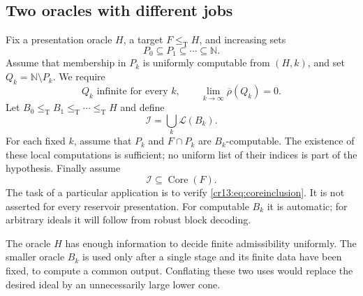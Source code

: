 \documentclass[11pt,letterpaper]{article}
\theoremstyle{definition}
\theoremstyle{remark}\newtheorem{remark}[theorem]{Remark}
\numberwithin{equation}{section}
\newcommand{\N}{\mathbb N}
\newcommand{\leT}{\leq_{\mathrm T}}
\newcommand{\Low}{\mathcal L}
\newcommand{\Core}{\operatorname{Core}}
\newcommand{\updens}{\overline\rho}
\newcommand{\Ideal}{\mathcal I}
\begin{document}
\subsection{Two oracles with different jobs}
Fix a presentation oracle $H$, a target $F\leT H$, and increasing sets
\[
                  P_0\subseteq P_1\subseteq\cdots\subseteq\N.
\]
Assume that membership in $P_k$ is uniformly computable from $(H,k)$, and set $Q_k=\N\setminus P_k$. We require
\begin{equation}\label{cr13:eq:smalltails}
                  Q_k\text{ infinite for every }k,
             \qquad\lim_{k\to\infty}\updens(Q_k)=0.
\end{equation}
Let $B_0\leT B_1\leT\cdots\leT H$ and define
\begin{equation}\label{cr13:eq:idealchain}
                         \Ideal=\bigcup_k\Low(B_k).
\end{equation}
For each fixed $k$, assume that $P_k$ and $F\cap P_k$ are $B_k$-computable. The existence of these local computations is sufficient; no uniform list of their indices is part of the hypothesis. Finally assume
\begin{equation}\label{cr13:eq:coreinclusion}
                               \Ideal\subseteq\Core(F).
\end{equation}
The task of a particular application is to verify \eqref{cr13:eq:coreinclusion}. It is not asserted for every reservoir presentation. For computable $B_k$ it is automatic; for arbitrary ideals it will follow from robust block decoding.

The oracle $H$ has enough information to decide finite admissibility uniformly. The smaller oracle $B_k$ is used only after a single stage and its finite data have been fixed, to compute a common output. Conflating these two uses would replace the desired ideal by an unnecessarily large lower cone.
\end{document}
